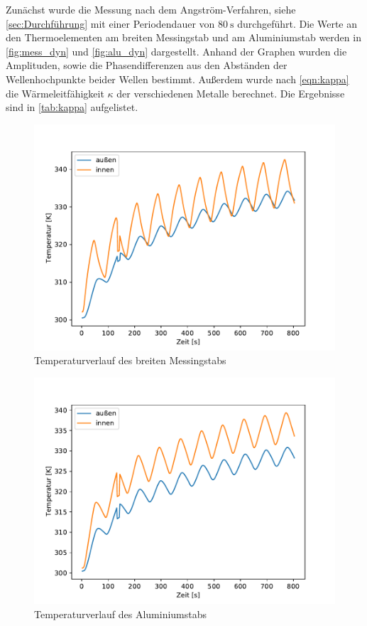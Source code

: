 Zunächst wurde die Messung nach dem Angström-Verfahren, siehe \autoref{sec:Durchführung} mit einer Periodendauer von $\qty{80}{\second}$ durchgeführt.
Die Werte an den Thermoelementen am breiten Messingstab und am Aluminiumstab werden in \autoref{fig:mess_dyn} und \autoref{fig:alu_dyn} dargestellt.
Anhand der Graphen wurden die Amplituden, sowie die Phasendifferenzen aus den Abständen der Wellenhochpunkte beider Wellen bestimmt.
Außerdem wurde nach \autoref{eqn:kappa} die Wärmeleitfähigkeit $\kappa$ der verschiedenen Metalle berechnet. Die Ergebnisse sind in \autoref{tab:kappa} aufgelistet.
\begin{figure}[!htbp]
  \centering
  \includegraphics{content/dyn_80_mess.pdf}
  \caption{Temperaturverlauf des breiten Messingstabs}
  \label{fig:mess_dyn}
\end{figure}
\begin{figure}[!htbp]
  \centering
  \includegraphics{content/dyn_80_alu.pdf}
  \caption{Temperaturverlauf des Aluminiumstabs}
  \label{fig:alu_dyn}
\end{figure}
	
